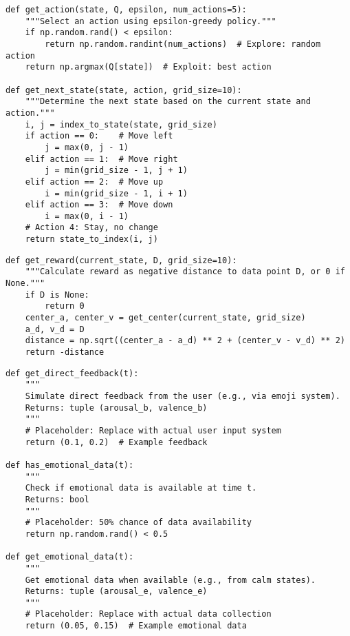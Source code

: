 \begin{lstlisting}[caption={Action Selection and State Transition},label={lst:action-selection}]
def get_action(state, Q, epsilon, num_actions=5):
    """Select an action using epsilon-greedy policy."""
    if np.random.rand() < epsilon:
        return np.random.randint(num_actions)  # Explore: random action
    return np.argmax(Q[state])  # Exploit: best action

def get_next_state(state, action, grid_size=10):
    """Determine the next state based on the current state and action."""
    i, j = index_to_state(state, grid_size)
    if action == 0:    # Move left
        j = max(0, j - 1)
    elif action == 1:  # Move right
        j = min(grid_size - 1, j + 1)
    elif action == 2:  # Move up
        i = min(grid_size - 1, i + 1)
    elif action == 3:  # Move down
        i = max(0, i - 1)
    # Action 4: Stay, no change
    return state_to_index(i, j)
\end{lstlisting}

\begin{lstlisting}[caption={Reward Calculation},label={lst:reward-calculation}]
def get_reward(current_state, D, grid_size=10):
    """Calculate reward as negative distance to data point D, or 0 if None."""
    if D is None:
        return 0
    center_a, center_v = get_center(current_state, grid_size)
    a_d, v_d = D
    distance = np.sqrt((center_a - a_d) ** 2 + (center_v - v_d) ** 2)
    return -distance
\end{lstlisting}

\begin{lstlisting}[caption={Placeholder Functions for Data Input},label={lst:data-input}]
def get_direct_feedback(t):
    """
    Simulate direct feedback from the user (e.g., via emoji system).
    Returns: tuple (arousal_b, valence_b)
    """
    # Placeholder: Replace with actual user input system
    return (0.1, 0.2)  # Example feedback

def has_emotional_data(t):
    """
    Check if emotional data is available at time t.
    Returns: bool
    """
    # Placeholder: 50% chance of data availability
    return np.random.rand() < 0.5

def get_emotional_data(t):
    """
    Get emotional data when available (e.g., from calm states).
    Returns: tuple (arousal_e, valence_e)
    """
    # Placeholder: Replace with actual data collection
    return (0.05, 0.15)  # Example emotional data
\end{lstlisting}

